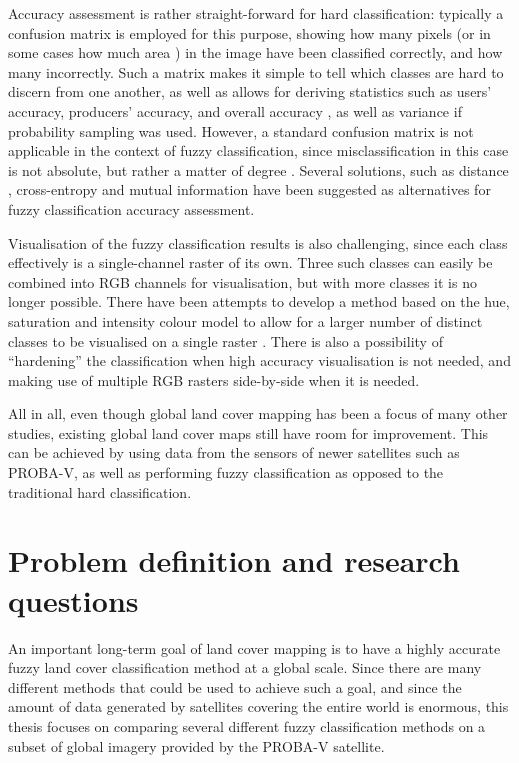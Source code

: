\documentclass[a4paper,12pt]{scrbook}
\begin{document}
Accuracy assessment is rather straight-forward for hard classification: typically a confusion matrix is employed for this purpose, showing how many pixels (or in some cases how much area \citep{stehman2009sampling}) in the image have been classified correctly, and how many incorrectly. Such a matrix makes it simple to tell which classes are hard to discern from one another, as well as allows for deriving statistics such as users' accuracy, producers' accuracy, and overall accuracy \citep{foody1996fuzzyevaluation}, as well as variance if probability sampling was used. However, a standard confusion matrix is not applicable in the context of fuzzy classification, since misclassification in this case is not absolute, but rather a matter of degree \citep{foody2002accuracy}. Several solutions, such as distance \citep{foody1996fuzzyevaluation}, cross-entropy and mutual information \citep{lu2007methods} have been suggested as alternatives for fuzzy classification accuracy assessment.

Visualisation of the fuzzy classification results is also challenging, since each class effectively is a single-channel raster of its own. Three such classes can easily be combined into RGB channels for visualisation, but with more classes it is no longer possible. There have been attempts to develop a method based on the hue, saturation and intensity colour model to allow for a larger number of distinct classes to be visualised on a single raster \citep{hengl2004fuzzycmeans}. There is also a possibility of ``hardening'' the classification when high accuracy visualisation is not needed, and making use of multiple RGB rasters side-by-side when it is needed.

All in all, even though global land cover mapping has been a focus of many other studies, existing global land cover maps still have room for improvement. This can be achieved by using data from the sensors of newer satellites such as PROBA-V, as well as performing fuzzy classification as opposed to the traditional hard classification.

\chapter{Problem definition and research questions}

An important long-term goal of land cover mapping is to have a highly accurate fuzzy land cover classification method at a global scale. Since there are many different methods that could be used to achieve such a goal, and since the amount of data generated by satellites covering the entire world is enormous, this thesis focuses on comparing several different fuzzy classification methods on a subset of global imagery provided by the PROBA-V satellite.
\end{document}
